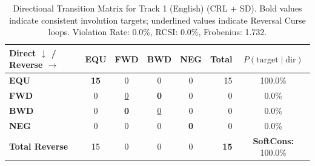 \begin{table}[ht]
\centering
\small
\begin{tabular}{l|cccc|r|c}
\toprule
\textbf{Direct $\downarrow$ / Reverse $\rightarrow$} & \textbf{EQU} & \textbf{FWD} & \textbf{BWD} & \textbf{NEG} & \textbf{Total} & \textbf{$P(\text{target} \mid \text{dir})$} \\
\midrule
\textbf{EQU} & \textbf{15} & 0 & 0 & 0 & 15 & 100.0\% \\
\textbf{FWD} & 0 & \underline{0} & \textbf{0} & 0 & 0 & 0.0\% \\
\textbf{BWD} & 0 & \textbf{0} & \underline{0} & 0 & 0 & 0.0\% \\
\textbf{NEG} & 0 & 0 & 0 & \textbf{0} & 0 & 0.0\% \\
\midrule
\textbf{Total Reverse} & 15 & 0 & 0 & 0 & \textbf{15} & \textbf{SoftCons:} 100.0\% \\
\bottomrule
\end{tabular}
\caption{Directional Transition Matrix for Track 1 (English) (CRL + SD). Bold values indicate consistent involution targets; underlined values indicate Reversal Curse loops. Violation Rate: 0.0\%, RCSI: 0.0\%, Frobenius: 1.732.}
\label{tab:transition_matrix}
\end{table}